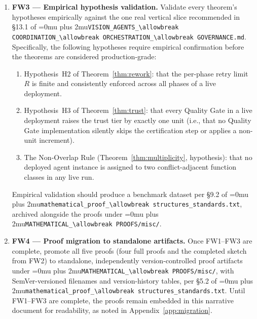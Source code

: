 \documentclass[12pt]{article}
\theoremstyle{definition}
\DeclareRobustCommand{\code}[1]{\begingroup\Urlmuskip=0mu plus 2mu\relax\nolinkurl{#1}\endgroup}
\newcommand{\VisionGov}{\code{VISION\_AGENTS\_\allowbreak COORDINATION\_\allowbreak ORCHESTRATION\_\allowbreak GOVERNANCE.md}}
\newcommand{\ProofStd}{\code{mathematical\_proof\_\allowbreak structures\_standards.txt}}
\begin{document}
\begin{enumerate}
    \item \textbf{FW3 --- Empirical hypothesis validation.}
          Validate every theorem's hypotheses empirically against the
          one real vertical slice recommended in \S13.1 of \VisionGov{}.
          Specifically, the following hypotheses require empirical
          confirmation before the theorems are considered production-grade:
          \begin{enumerate}
              \item[FW3a.] Hypothesis~H2 of Theorem~\ref{thm:rework}:
                    that the per-phase retry limit $R$ is finite and
                    consistently enforced across all phases of a live
                    deployment.
              \item[FW3b.] Hypothesis~H3 of Theorem~\ref{thm:trust}:
                    that every Quality Gate in a live deployment raises
                    the trust tier by exactly one unit (i.e., that no
                    Quality Gate implementation silently skips the
                    certification step or applies a non-unit increment).
              \item[FW3c.] The Non-Overlap Rule
                    (Theorem~\ref{thm:multiplicity}, hypothesis):
                    that no deployed agent instance is
                    assigned to two conflict-adjacent function classes
                    in any live run.
          \end{enumerate}
          Empirical validation should produce a benchmark dataset
          per \S9.2 of \ProofStd{}, archived alongside the proofs
          under \code{MATHEMATICAL\_\allowbreak PROOFS/misc/}.

    \item \textbf{FW4 --- Proof migration to standalone artifacts.}
          Once FW1--FW3 are complete, promote all five proofs
          (four full proofs and the completed sketch from FW2) to
          standalone, independently version-controlled proof artifacts
          under \code{MATHEMATICAL\_\allowbreak PROOFS/misc/}, with
          SemVer-versioned filenames and version-history tables, per
          \S5.2 of \ProofStd{}.  Until FW1--FW3 are complete, the
          proofs remain embedded in this narrative document for
          readability, as noted in Appendix~\ref{app:migration}.


\end{enumerate}
\end{document}
